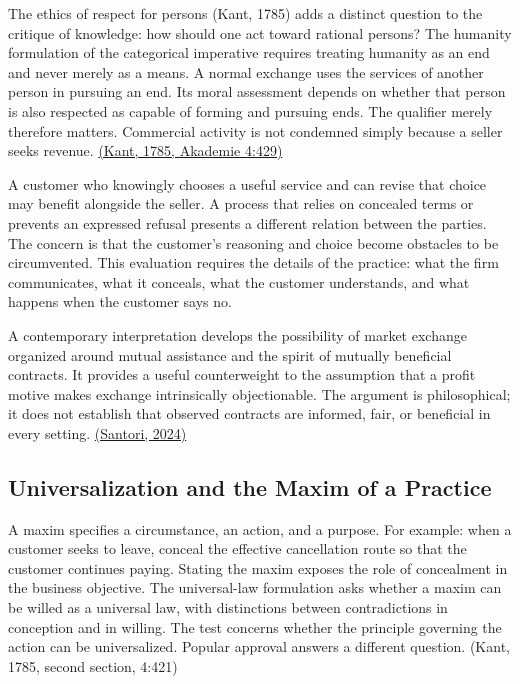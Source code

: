 \noindent \noindent The ethics of respect for persons (Kant, 1785) adds a distinct
question to the critique of knowledge: how should one act toward
rational persons? The humanity formulation of the categorical imperative
requires treating humanity as an end and never merely as a means. A
normal exchange uses the services of another person in pursuing an end.
Its moral assessment depends on whether that person is also respected as
capable of forming and pursuing ends. The qualifier merely therefore
matters. Commercial activity is not condemned simply because a seller
seeks revenue.
\href{https://www.gutenberg.org/files/5682/5682-h/5682-h.htm}{(Kant,
1785, Akademie 4:429)}

A customer who knowingly chooses a useful service and can revise that
choice may benefit alongside the seller. A process that relies on
concealed terms or prevents an expressed refusal presents a different
relation between the parties. The concern is that the customer's
reasoning and choice become obstacles to be circumvented. This
evaluation requires the details of the practice: what the firm
communicates, what it conceals, what the customer understands, and what
happens when the customer says no.

A contemporary interpretation develops the possibility of market
exchange organized around mutual assistance and the spirit of mutually
beneficial contracts. It provides a useful counterweight to the
assumption that a profit motive makes exchange intrinsically
objectionable. The argument is philosophical; it does not establish that
observed contracts are informed, fair, or beneficial in every setting.
\href{https://link.springer.com/article/10.1007/s40926-024-00252-z}{(Santori,
2024)}

\hypertarget{M09-universalization-and-the-maxim-of-a-practice}{%
\subsection{Universalization and the Maxim of a
Practice}\label{M09-universalization-and-the-maxim-of-a-practice}}

\noindent \noindent A maxim specifies a circumstance, an action, and a purpose.
For example: when a customer seeks to leave, conceal the effective
cancellation route so that the customer continues paying. Stating the
maxim exposes the role of concealment in the business objective. The
universal-law formulation asks whether a maxim can be willed as a
universal law, with distinctions between contradictions in conception
and in willing. The test concerns whether the principle governing the
action can be universalized. Popular approval answers a different
question. (Kant, 1785, second section, 4:421)

